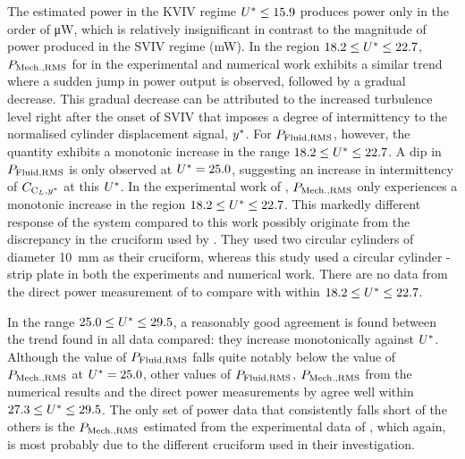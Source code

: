 \documentclass[oneside]{utmthesis}
\begin{document}
The estimated power in the KVIV regime $U^{*} \leq 15.9$ produces power only in the order of \si{\micro\watt}, which is relatively insignificant in contrast to the magnitude of power produced in the SVIV regime (mW). In the region $18.2 \leq U^{*} \leq 22.7$, $P_{\text{Mech.,RMS}}$ for in the experimental and numerical work exhibits a similar trend where a sudden jump in power output is observed, followed by a gradual decrease. This gradual decrease can be attributed to the increased turbulence level right after the onset of SVIV that imposes a degree of intermittency to the normalised cylinder displacement signal, $y^{*}$. For $P_{\text{Fluid,RMS}}$, however, the quantity exhibits a monotonic increase in the range $18.2 \leq U^{*} \leq 22.7$. A dip in $P_{\text{Fluid,RMS}}$ is only observed at $U^{*} = 25.0$, suggesting an increase in intermittency of $C_{\text{C}_{L},y^{*}}$ at this $U^{*}$. In the experimental work of \citet{Nguyen2012}, $P_{\text{Mech.,RMS}}$ only experiences a monotonic increase in the region $18.2 \leq U^{*} \leq 22.7$. This markedly different response of the system compared to this work possibly originate from the discrepancy in the cruciform used by \citet{Nguyen2012}. They used two circular cylinders of diameter \SI{10}{\milli\metre} as their cruciform, whereas this study used a circular cylinder - strip plate in both the experiments and numerical work. There are no data from the direct power measurement of \citet{Koide2013} to compare with within $18.2 \leq U^{*} \leq 22.7$.

In the range $25.0 \leq U^{*} \leq 29.5$, a reasonably good agreement is found between the trend found in all data compared: they increase monotonically against $U^{*}$. Although the value of $P_{\text{Fluid,RMS}}$ falls quite notably below the value of $P_{\text{Mech.,RMS}}$ at $U^{*} = 25.0$, other values of $P_{\text{Fluid,RMS}}$, $P_{\text{Mech.,RMS}}$ from the numerical results and the direct power measurements by \citet{Koide2013} agree well within $27.3 \leq U^{*} \leq 29.5$. The only set of power data that consistently falls short of the others is the $P_{\text{Mech.,RMS}}$ estimated from the experimental data of \citet{Nguyen2012}, which again, is most probably due to the different cruciform used in their investigation.
\end{document}
